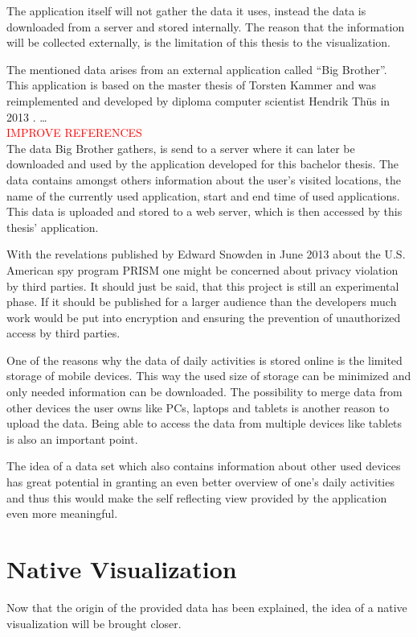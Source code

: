 The application itself will not gather the data it uses, instead the data is downloaded from a server and stored internally. The reason that the information will be collected externally, is the limitation of this thesis to the visualization.

The  mentioned data arises from an external application called ``Big Brother''. This application is based on the master thesis of Torsten Kammer and was reimplemented and developed by diploma computer scientist Hendrik Th\"us in 2013 \cite{bigbrother}. \ldots{} %
\\ \textcolor{red}{IMPROVE REFERENCES}\\
The data Big Brother gathers, is send to a server where it can later be downloaded and used by the application developed for this bachelor thesis. The data contains amongst others information about the user's visited locations, the name of the currently used application, start and end time of used applications. This data is uploaded and stored to a web server, which is then accessed by this thesis' application.

With  the revelations published by Edward Snowden in June 2013 about the U.S. American spy program PRISM one might be concerned about privacy violation by third parties. It should just be said, that this project is still an experimental phase. If it should be published for a larger audience than the developers much work would be put into encryption and ensuring the prevention of unauthorized access by third parties.

One  of the reasons why the data of daily activities is stored online is the limited storage of mobile devices. This way the used size of storage can be minimized and only needed information can be downloaded. The possibility to merge data from other devices the user owns like PCs, laptops and tablets is another reason to upload the data. Being able to access the data from multiple devices like tablets is also an important point.

The idea of a data set which also contains information about other used devices has great potential in granting an even better overview of one's daily activities and thus this would make the self reflecting view provided by the application even more meaningful.

\newpage
\section{Native Visualization}
Now that the origin of the provided data has been explained, the idea of a native visualization will be brought closer.

